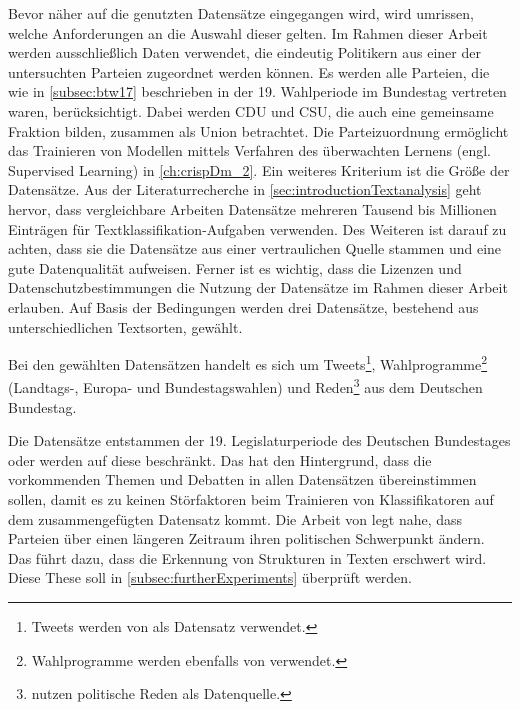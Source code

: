 Bevor näher auf die genutzten Datensätze eingegangen wird, wird umrissen, welche Anforderungen an die Auswahl dieser gelten. Im Rahmen dieser Arbeit werden ausschließlich Daten verwendet, die eindeutig Politikern aus einer der untersuchten Parteien zugeordnet werden können. Es werden alle Parteien, die wie in \autoref{subsec:btw17} beschrieben in der \num{19}. Wahlperiode im Bundestag vertreten waren, berücksichtigt. Dabei werden \ac{CDU} und \ac{CSU}, die auch eine gemeinsame Fraktion bilden, zusammen als Union betrachtet. Die Parteizuordnung ermöglicht das Trainieren von Modellen mittels Verfahren des überwachten Lernens (engl. Supervised Learning) in \autoref{ch:crispDm_2}. Ein weiteres Kriterium ist die Größe der Datensätze. Aus der Literaturrecherche in \autoref{sec:introductionTextanalysis} geht hervor, dass vergleichbare Arbeiten Datensätze mehreren Tausend bis Millionen Einträgen für Textklassifikation-Aufgaben verwenden. Des Weiteren ist darauf zu achten, dass sie die Datensätze aus einer vertraulichen Quelle stammen und eine gute Datenqualität aufweisen. Ferner ist es wichtig, dass die Lizenzen und Datenschutzbestimmungen die Nutzung der Datensätze im Rahmen dieser Arbeit erlauben. Auf Basis der Bedingungen werden drei Datensätze, bestehend aus unterschiedlichen Textsorten, gewählt.

Bei den  gewählten Datensätzen handelt es sich um Tweets\footnote{Tweets werden von \textcite{saltzer_bundestagswahl_2022, saltzer_finding_2022, guhr_training_2020, wong_quantifying_2016} als Datensatz verwendet.}, Wahlprogramme\footnote{Wahlprogramme werden ebenfalls von \textcite{biessmann_predicting_2016} verwendet.} (Landtags-, Europa- und Bundestagswahlen) und Reden\footnote{\textcite{doan_using_2022, biessmann_predicting_2016, simoes_fine-tuned_2020} nutzen politische Reden als Datenquelle.} aus dem Deutschen Bundestag.

Die Datensätze entstammen der 19. Legislaturperiode des Deutschen Bundestages oder werden auf diese beschränkt. Das hat den Hintergrund, dass die vorkommenden Themen und Debatten in allen Datensätzen übereinstimmen sollen, damit es zu keinen Störfaktoren beim Trainieren von Klassifikatoren auf dem zusammengefügten Datensatz kommt. Die Arbeit von \textcite{richter_open_2021} legt nahe, dass Parteien über einen längeren Zeitraum ihren politischen Schwerpunkt ändern. Das führt dazu, dass die Erkennung von Strukturen in Texten erschwert wird. Diese These soll in \autoref{subsec:furtherExperiments} überprüft werden.

